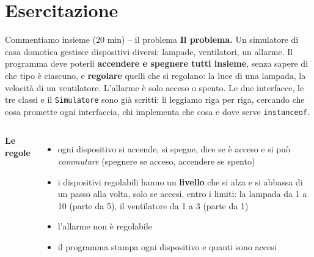 \documentclass[10pt,aspectratio=169]{beamer}
\begin{document}
\section{Esercitazione}

\begin{frame}[fragile]{Commentiamo insieme (20 min) -- il problema}
\footnotesize
\textbf{Il problema.} Un simulatore di casa domotica gestisce dispositivi diversi: lampade, ventilatori, un allarme. Il programma deve poterli \textbf{accendere e spegnere tutti insieme}, senza sapere di che tipo è ciascuno, e \textbf{regolare} quelli che si regolano: la luce di una lampada, la velocità di un ventilatore. L'allarme è solo acceso o spento. Le due interfacce, le tre classi e il \texttt{Simulatore} sono già scritti: li leggiamo riga per riga, cercando che cosa promette ogni interfaccia, chi implementa che cosa e dove serve \texttt{instanceof}.

\vspace{0.05cm}
\begin{columns}[T]
\textbf{Le regole}
\begin{itemize}\itemsep=2pt
    \item ogni dispositivo si accende, si spegne, dice se è acceso e si può \emph{commutare} (spegnere se acceso, accendere se spento)
    \item i dispositivi regolabili hanno un \textbf{livello} che si alza e si abbassa di un passo alla volta, solo se accesi, entro i limiti: la lampada da 1 a 10 (parte da 5), il ventilatore da 1 a 3 (parte da 1)
    \item l'allarme non è regolabile
    \item il programma stampa ogni dispositivo e quanti sono accesi
\end{itemize}

\end{columns}
\end{frame}
\end{document}
